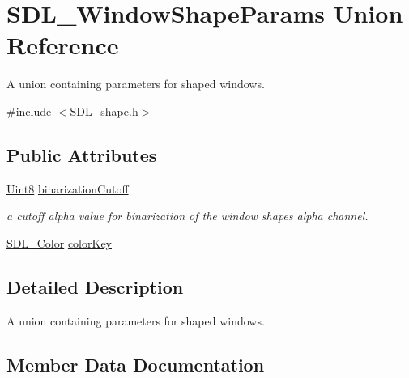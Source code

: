 \hypertarget{union_s_d_l___window_shape_params}{}\section{S\+D\+L\+\_\+\+Window\+Shape\+Params Union Reference}
\label{union_s_d_l___window_shape_params}


A union containing parameters for shaped windows.  




{\ttfamily \#include $<$S\+D\+L\+\_\+shape.\+h$>$}

\subsection*{Public Attributes}
\begin{DoxyCompactItemize}
\item 
\hyperlink{_s_d_l__stdinc_8h_a2944638813a090aa23e62f4da842c3e2}{Uint8} \hyperlink{union_s_d_l___window_shape_params_a534c40b09588a8075c0a70227753dc56}{binarization\+Cutoff}
\begin{DoxyCompactList}\small\item\em a cutoff alpha value for binarization of the window shape\textquotesingle{}s alpha channel. \end{DoxyCompactList}\item 
\hyperlink{struct_s_d_l___color}{S\+D\+L\+\_\+\+Color} \hyperlink{union_s_d_l___window_shape_params_a8bf3e442a51a1bbf452cfec7c1ed5318}{color\+Key}
\end{DoxyCompactItemize}


\subsection{Detailed Description}
A union containing parameters for shaped windows. 

\subsection{Member Data Documentation}
\mbox{\label{union_s_d_l___window_shape_params_a534c40b09588a8075c0a70227753dc56}} 
